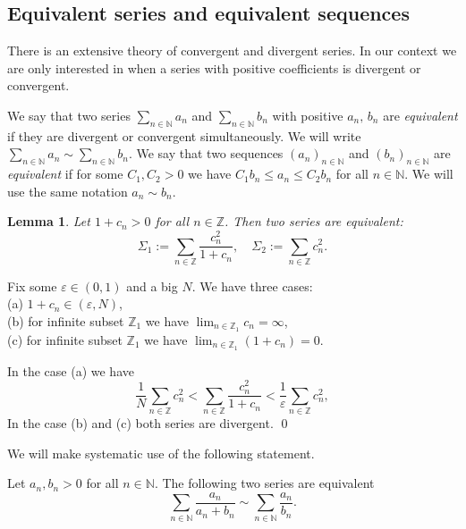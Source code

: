 \documentclass[preprint,12pt]{elsarticle}
\newtheorem{lem}[thm]{Lemma}
\numberwithin{equation}{section}
\begin{document}
\subsection{Equivalent series and equivalent sequences}
%
There is an extensive 
theory of convergent and divergent series. In our context we are only interested in when a series with positive coefficients is divergent or convergent.  
%
\begin{df}
\label{df.two-sim-ser} We say  that two series $\sum_{n\in\mathbb N}a_n$ and  $\sum_{n\in\mathbb N}b_n$ with positive $a_n,\,b_n$ are {\it equivalent} if  they are divergent or convergent simultaneously. We will write
$\sum_{n\in\mathbb N}a_n\sim 
\sum_{n\in\mathbb N}b_n$. 
We say that two sequences $(a_n)_{n\in\mathbb N}$ and $(b_n)_{n\in\mathbb N}$ are {\it equivalent} if for some 
$C_1,C_2>0$ we have $C_1b_n\leq a_n\leq C_2b_n$ for all $n\in \mathbb N$. We will use the same notation $a_n\sim b_n$.
\end{df}
\begin{lem}
%

\label{l.two-ser-alpha}
Let $1+c_n>0$   for all $n\in \mathbb Z$. Then two series 
are equivalent:
\begin{equation}
\label{two-ser-alpha} 
\Sigma_1%
:=\sum_{n\in \mathbb Z}
\frac{ c_n^2}{1+c_n},\quad \Sigma_2
:=\sum_{n\in \mathbb Z}c_n^2.
\end{equation}
\end{lem}
\begin{pf}
Fix some $\varepsilon\in (0,1)$ and a big $N$. We have three cases:\\
(a) $1+c_n\in (\varepsilon,N)$,\\
(b) for infinite subset $\mathbb Z_1$ we have $\lim_{n\in \mathbb Z_1}c_n=\infty$,\\
(c)   for infinite subset $\mathbb Z_1$ we have $\lim_{n\in \mathbb Z_1}(1+c_n)=0$.

In the case (a) we have
\begin{equation}
\label{(a)}
\frac{1}{N}\sum_{n\in \mathbb Z} c_n^2<
 \sum_{n\in \mathbb Z}
\frac{ c_n^2}{1+c_n}<\frac{1}{\varepsilon}\sum_{n\in \mathbb Z}c_n^2,
\end{equation}
In the case (b) and (c) both series are divergent.
\qed\end{pf}

We will make systematic use of the following statement.
\begin{rem}
Let $a_n,b_n>0$ for all $n\in \mathbb N$. The following two series  are equivalent
\label{r.two-sim-ser}
\begin{equation}
 \label{two-sim-ser}
 \sum_{n\in\mathbb N}\frac{a_n}{a_n+b_n}\sim \sum_{n\in\mathbb N}\frac{a_n}{b_n}.
\end{equation}
\end{rem}
\end{document}
